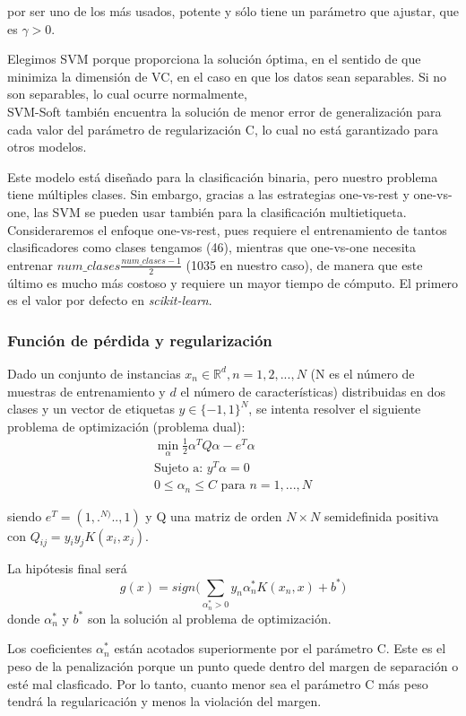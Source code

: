 \documentclass[a4]{article}
\begin{document}
por ser uno de los más usados, potente y sólo tiene un parámetro que ajustar, que es $\gamma>0$. 

Elegimos SVM porque proporciona la solución óptima, en el sentido de que minimiza la dimensión de VC, en el caso en que los datos sean separables. Si no son separables, lo cual ocurre normalmente,\\ SVM-Soft también encuentra la solución de menor error de generalización para cada valor del parámetro de regularización C, lo cual no está garantizado para otros modelos. 

Este modelo está diseñado para la clasificación binaria, pero nuestro problema tiene múltiples clases. Sin embargo, gracias a las estrategias one-vs-rest y one-vs-one, las SVM se pueden usar también para la clasificación multietiqueta. Consideraremos el enfoque one-vs-rest, pues requiere el entrenamiento de tantos clasificadores como clases tengamos (46), mientras que one-vs-one necesita entrenar $num\_clases\frac{num\_clases - 1}{2}$ (1035 en nuestro caso), de manera que este último es mucho más costoso y requiere un mayor tiempo de cómputo. El primero es el valor por defecto en \textit{scikit-learn}. 

\subsubsection{Función de pérdida y regularización} 

Dado un conjunto de instancias $x_n\in\mathbb{R}^d, n=1,2,...,N$ (N es el número de muestras de entrenamiento y $d$ el número de características) distribuidas en dos clases y un vector de etiquetas $y\in \{-1,1\}^N$, se intenta resolver el siguiente problema de optimización (problema dual):
\begin{align*}
\min\limits_{\alpha}\frac{1}{2}\alpha^TQ\alpha - e^T\alpha\\
\text{Sujeto a: } y^T \alpha =0\\
 0\leq \alpha_n \leq C \text{ para } n=1,...,N
\end{align*}

siendo $e^T=(1,.^{N)}..,1)$ y Q  una matriz de orden $N\times N$ semidefinida positiva con $Q_{ij}=y_iy_jK(x_i,x_j)$.

La hipótesis final será 
$$g(x)=sign\big( \sum_{\alpha_n^{*}>0}y_n\alpha_n^{*}K(x_n,x)+b^{*} \big)$$
donde $\alpha_n^{*}$ y $b^{*}$ son la solución al problema de optimización. 

Los coeficientes $\alpha_n^{*}$ están acotados superiormente por el parámetro C. Este es el peso de la penalización porque un punto quede dentro del margen de separación o esté mal clasficado. Por lo tanto, cuanto menor sea el parámetro C más peso tendrá la regularicación y menos la violación del margen.  
\end{document}
